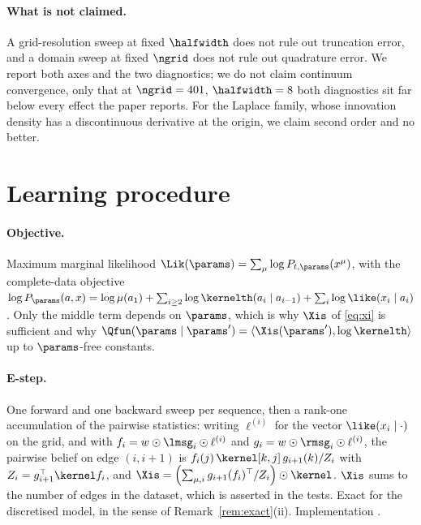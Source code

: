 \paragraph{What is not claimed.} A grid-resolution sweep at fixed $\halfwidth$ does not rule out
truncation error, and a domain sweep at fixed $\ngrid$ does not rule out quadrature error. We
report both axes and the two diagnostics; we do not claim continuum convergence, only that at
$\ngrid=401$, $\halfwidth=8$ both diagnostics sit far below every effect the paper reports.
For the Laplace family, whose innovation density has a discontinuous derivative at the origin, we
claim second order and no better.

\section{Learning procedure}
\label{app:learning}

\paragraph{Objective.} Maximum marginal likelihood
$\Lik(\params) = \sum_\mu\log P_{t,\params}(x^\mu)$, with the complete-data objective
$\log P_\params(a,x) = \log\mu(a_1) + \sum_{i\ge2}\log\kernelth(a_i\mid a_{i-1}) +
\sum_i\log\like(x_i\mid a_i)$. Only the middle term depends on $\params$, which is why $\Xis$ of
\eqref{eq:xi} is sufficient and why $\Qfun(\params\mid\params') = \langle\Xis(\params'),
\log\kernelth\rangle$ up to $\params$-free constants.

\paragraph{E-step.} One forward and one backward sweep per sequence, then a rank-one accumulation
of the pairwise statistics: writing $\ell^{(i)}$ for the vector $\like(x_i\mid \cdot)$ on the
grid, and with $f_i = w\odot\lmsg_i\odot\ell^{(i)}$ and $g_i = w\odot\rmsg_i\odot\ell^{(i)}$,
the pairwise belief on edge $(i,i+1)$ is
$f_i(j)\,\kernel[k,j]\,g_{i+1}(k)/Z_i$ with $Z_i = g_{i+1}^\top \kernel f_i$, and
$\Xis = \left(\sum_{\mu,i} g_{i+1}(f_i)^\top/Z_i\right)\odot \kernel$. $\Xis$ sums to the number
of edges in the dataset, which is asserted in the tests. Exact for the discretised model, in the
sense of Remark~\ref{rem:exact}(ii). Implementation .


